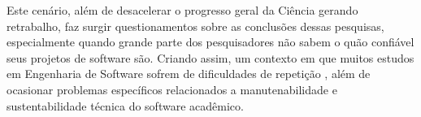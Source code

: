 Este cenário, além de desacelerar o progresso geral da Ciência gerando
retrabalho, faz surgir questionamentos sobre as conclusões dessas pesquisas,
especialmente quando grande parte dos pesquisadores não sabem o quão confiável
seus projetos de software são. Criando assim, um contexto em que muitos estudos
em Engenharia de Software sofrem de dificuldades de repetição
\cite{tang2016worthiness}, além de ocasionar problemas específicos relacionados a
manutenabilidade e sustentabilidade técnica do software acadêmico.
